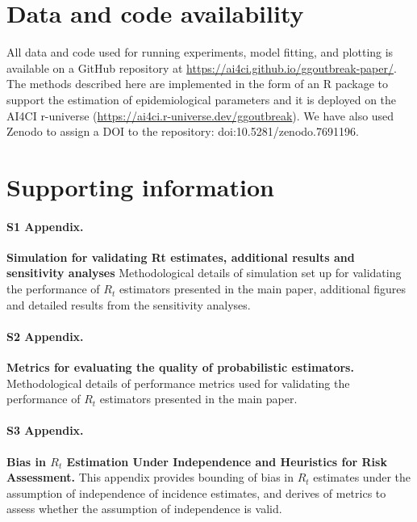 \documentclass[10pt,letterpaper]{article}
\begin{document}
\section*{Data and code availability}

All data and code used for running experiments, model fitting, and plotting is available on a GitHub repository at \url{https://ai4ci.github.io/ggoutbreak-paper/}. The methods described here are implemented in the form of an R package to support the estimation of epidemiological parameters and it is deployed on the AI4CI r-universe (\url{https://ai4ci.r-universe.dev/ggoutbreak}). We have also used Zenodo to assign a DOI to the repository: doi:10.5281/zenodo.7691196.

\section*{Supporting information}


\paragraph*{S1 Appendix.}
\label{S1_Appendix}
{\bf Simulation for validating Rt estimates, additional results and sensitivity analyses} Methodological details of simulation set up for validating the performance of $R_t$ estimators presented in the main paper, additional figures and detailed results from the sensitivity analyses.

\paragraph*{S2 Appendix.}
\label{S2_Appendix}
{\bf Metrics for evaluating the quality of probabilistic estimators.} Methodological details of performance metrics used for validating the performance of $R_t$ estimators presented in the main paper.

\paragraph*{S3 Appendix.}
\label{S3_Appendix}
{\bf Bias in $ R_t $ Estimation Under Independence and Heuristics for Risk Assessment.} This appendix provides bounding of bias in $R_t$ estimates under the assumption of independence of incidence estimates, and derives of metrics to assess whether the assumption of independence is valid.
\end{document}
